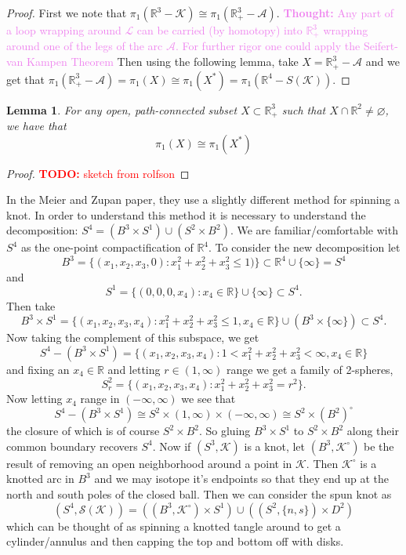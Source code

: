 \documentclass{amsart}
\def\todo#1{\textcolor{red}{\textbf{TODO: }{#1}}}
\def\thought#1{\textcolor{violet}{\textbf{Thought: }{#1}}}
\newtheorem{lemma}[theorem]{Lemma}
\theoremstyle{definition}
\begin{document}
\begin{proof}
First we note that $\pi_{1}(\mathbb{R}^{3} - \mathcal{K}) \cong \pi_{1}(\mathbb{R}^{3}_{+} - \mathcal{A}).$ \thought{Any part of a loop wrapping around $\mathcal{L}$ can be carried (by homotopy) into $\mathbb{R}^{3}_{+}$ wrapping around one of the legs of the arc $\mathcal{A}$. For further rigor one could apply the Seifert-van Kampen Theorem} Then using the following lemma, take $X = \mathbb{R}^{3}_{+} - \mathcal{A}$ and we get that $\pi_{1}(\mathbb{R}^{3}_{+} - \mathcal{A})= \pi_{1}(X) \cong \pi_{1}(X^{*}) = \pi_{1}(\mathbb{R}^{4} - S(\mathcal{K})).$
\end{proof}
\begin{lemma}
For any open, path-connected subset $X \subset \mathbb{R}^{3}_{+}$ such that $X \cap \mathbb{R}^{2} \neq \varnothing$, we have that $$\pi_{1}(X) \cong \pi_{1}(X^{*})$$
\end{lemma}
\begin{proof}
\todo{sketch from rolfson}
\end{proof}
In the Meier and Zupan paper, they use a slightly different method for spinning a knot. In order to understand this method it is necessary to understand the decomposition: $S^{4} = (B^{3} \times S^{1}) \cup (S^{2} \times B^{2}).$ We are familiar/comfortable with $S^{4}$ as the one-point compactification of $\mathbb{R}^{4}.$ To consider the new decomposition let $$B^{3} = \{(x_{1}, x_{2}, x_{3}, 0) : x_{1}^{2} + x_{2}^{2} + x_{3}^{2} \leq 1)\} \subset \mathbb{R}^{4} \cup \{\infty\} = S^{4}$$ and $$S^{1} = \{(0, 0, 0, x_{4}) : x_{4} \in \mathbb{R}\} \cup \{\infty\} \subset S^{4}.$$ Then take $$B^{3} \times S^{1} =  \{(x_{1}, x_{2}, x_{3}, x_{4}): x_{1}^{2} + x_{2}^{2} + x_{3}^{2} \leq 1, x_{4} \in \mathbb{R}\} \cup (B^{3} \times \{\infty\}) \subset S^{4}.$$ Now taking the complement of this subspace, we get $$S^{4} - (B^{3} \times S^{1}) = \{(x_{1}, x_{2}, x_{3}, x_{4}): 1 < x_{1}^{2} + x_{2}^{2} + x_{3}^{2} < \infty , x_{4} \in \mathbb{R}\} $$ and fixing an $x_{4} \in \mathbb{R}$ and letting $r \in (1, \infty)$ range we get a family of 2-spheres, $$S_{r}^{2} = \{(x_{1}, x_{2}, x_{3}, x_{4}) : x_{1}^{2} + x_{2}^{2} + x_{3}^{2} = r^{2}\}.$$ Now letting $x_{4}$ range in $(-\infty, \infty)$ we see that $$S^{4} - (B^{3} \times S^{1}) \cong S^{2} \times (1, \infty) \times (-\infty, \infty) \cong S^{2} \times (B^{2})^{\circ}$$ the closure of which is of course $S^{2} \times B^{2}.$ So gluing $B^{3} \times S^{1}$ to $S^{2} \times B^{2}$ along their common boundary recovers $S^{4}.$ \newline \newline Now if $(S^{3}, \mathcal{K})$ is a knot, let $(B^{3}, \mathcal{K}^{\circ})$ be the result of removing an open neighborhood around a point in $\mathcal{K}.$ Then $\mathcal{K}^{\circ}$ is a knotted arc in $B^{3}$ and we may isotope it's endpoints so that they end up at the north and south poles of the closed ball. Then we can consider the spun knot as $$(S^{4}, \mathcal{S}(\mathcal{K})) = ((B^{3}, \mathcal{K}^{\circ}) \times S^{1}) \cup ((S^{2}, \{n, s\}) \times D^{2})$$ which can be thought of as spinning a knotted tangle around to get a cylinder/annulus and then capping the top and bottom off with disks.
\end{document}
